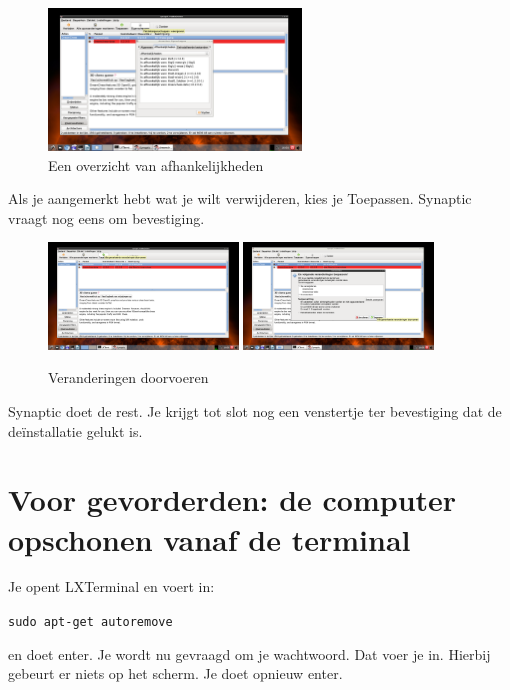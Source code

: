 \documentclass[12pt,a4paper]{article}
\begin{document}
\begin{figure} [H]
\centering
\includegraphics[width=0.6\textwidth]{plaatje18}
\caption{Een overzicht van afhankelijkheden}
\label{plaatje18}
\end{figure}

Als je aangemerkt hebt wat je wilt verwijderen, kies je Toepassen. Synaptic vraagt nog eens om bevestiging.  

\begin{figure} [H]
\centering
\includegraphics[width=0.45\textwidth]{plaatje19}
\includegraphics[width=0.45\textwidth]{plaatje20}
\caption{Veranderingen doorvoeren}
\label{plaatje19}
\end{figure}

Synaptic doet de rest. Je krijgt tot slot nog een venstertje ter bevestiging dat de de\"{i}nstallatie gelukt is.

\clearpage

\section{Voor gevorderden: de computer opschonen vanaf de terminal}

Je opent LXTerminal en voert in:

\texttt{sudo apt-get autoremove}

en doet enter. Je wordt nu gevraagd om je wachtwoord. Dat voer je in. Hierbij gebeurt er niets op het scherm. Je doet opnieuw enter. 
\end{document}
